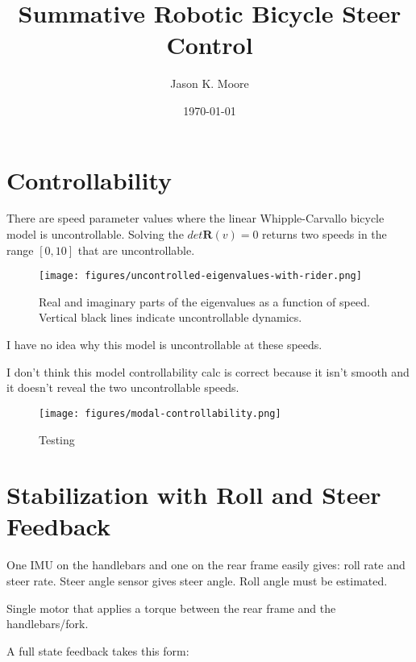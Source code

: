 \documentclass[12pt]{article}
\title{Summative Robotic Bicycle Steer Control}
\author{Jason K. Moore}
\date{\today}
\begin{document}
\maketitle

\section{Controllability}

There are speed parameter values where the linear Whipple-Carvallo bicycle
model is uncontrollable. Solving the \(det{\mathbf{R}(v)}=0\) returns two
speeds in the range \([0, 10]\) that are uncontrollable.

\begin{figure}
  \centering
  \texttt{[image: figures/uncontrolled-eigenvalues-with-rider.png]}
  \caption{Real and imaginary parts of the eigenvalues as a function of speed.
  Vertical black lines indicate uncontrollable dynamics.}
  \label{fig:uncontrolled-eigenvalues-with-rider}
\end{figure}

I have no idea why this model is uncontrollable at these speeds.

I don't think this model controllability calc is correct because it isn't
smooth and it doesn't reveal the two uncontrollable speeds.

\begin{figure}
  \centering
  \texttt{[image: figures/modal-controllability.png]}
  \caption{Testing}
  \label{fig:modal-controllability}
\end{figure}

\section{Stabilization with Roll and Steer Feedback}

One IMU on the handlebars and one on the rear frame easily gives: roll rate and
steer rate. Steer angle sensor gives steer angle. Roll angle must be estimated.

Single motor that applies a torque between the rear frame and the
handlebars/fork.

A full state feedback takes this form:
\end{document}
